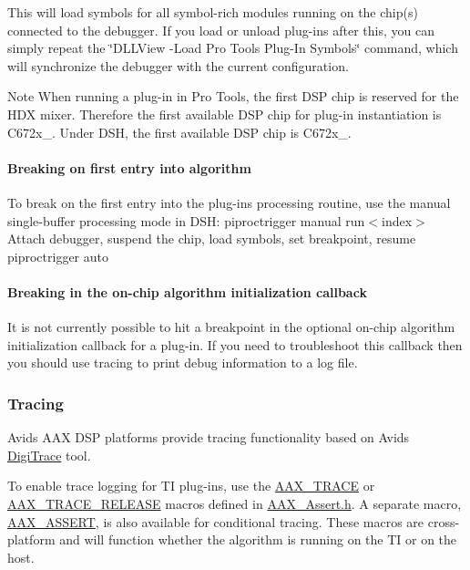 This will load symbols for all symbol-\/rich modules running on the chip(s) connected to the debugger. If you load or unload plug-\/ins after this, you can simply repeat the \char`\"{}\+D\+L\+L\+View -\/\+Load Pro Tools Plug-\/\+In Symbols\char`\"{} command, which will synchronize the debugger with the current configuration.

\begin{DoxyNote}{Note}
When running a plug-\/in in Pro Tools, the first D\+S\+P chip is reserved for the H\+D\+X mixer. Therefore the first available D\+S\+P chip for plug-\/in instantiation is {\ttfamily C672x\+\_}. Under D\+S\+H, the first available D\+S\+P chip is {\ttfamily C672x\+\_}.
\end{DoxyNote}
\hypertarget{a00362_subsubsection__breaking_on_first_entry_into_algorithm_}{}\paragraph{Breaking on first entry into algorithm}\label{a00362_subsubsection__breaking_on_first_entry_into_algorithm_}
 To break on the first entry into the plug-\/in\textquotesingle{}s processing routine, use the manual single-\/buffer processing mode in D\+S\+H\+:  {\ttfamily piproctrigger manual}   {\ttfamily run$<$index$>$ }  Attach debugger, suspend the chip, load symbols, set breakpoint, resume   {\ttfamily piproctrigger auto }

\hypertarget{a00362_subsubsection__breaking_on_algorithm_initialization}{}\paragraph{Breaking in the on-\/chip algorithm initialization callback}\label{a00362_subsubsection__breaking_on_algorithm_initialization}
 It is not currently possible to hit a breakpoint in the optional on-\/chip algorithm initialization callback for a plug-\/in. If you need to troubleshoot this callback then you should use tracing to print debug information to a log file.

\hypertarget{a00362_subsection__tracing}{}\subsubsection{Tracing}\label{a00362_subsection__tracing}
Avid\textquotesingle{}s A\+A\+X D\+S\+P platforms provide tracing functionality based on Avid\textquotesingle{}s \hyperlink{a00364}{Digi\+Trace} tool.

To enable trace logging for T\+I plug-\/ins, use the \hyperlink{a00158_ab53f1d6a94f8b6ebb3a101f71bfe4e82}{A\+A\+X\+\_\+\+T\+R\+A\+C\+E} or \hyperlink{a00158_ac2aa820ece56bb59140ad561218db4b3}{A\+A\+X\+\_\+\+T\+R\+A\+C\+E\+\_\+\+R\+E\+L\+E\+A\+S\+E} macros defined in {\ttfamily \hyperlink{a00158}{A\+A\+X\+\_\+\+Assert.\+h}}. A separate macro, \hyperlink{a00158_a168ee44fd7a5485ab50160db36fb2988}{A\+A\+X\+\_\+\+A\+S\+S\+E\+R\+T}, is also available for conditional tracing. These macros are cross-\/platform and will function whether the algorithm is running on the T\+I or on the host.

